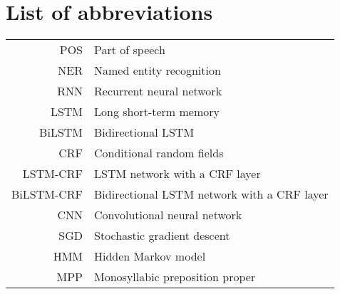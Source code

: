 \documentclass[english,bachelor,unicode]{ctufit-thesis}
\theoremstyle{plain}
\theoremstyle{definition}
\theoremstyle{remark}
\numberwithin{theorem}{chapter}
\begin{document}
\printabstractpage %











\chapter{List of abbreviations}
	
\begin{tabular}{rl}
POS & Part of speech\\
NER & Named entity recognition\\
RNN & Recurrent neural network\\
LSTM & Long short-term memory\\
BiLSTM & Bidirectional LSTM\\
CRF & Conditional random fields\\
LSTM-CRF & LSTM network with a CRF layer\\
BiLSTM-CRF & Bidirectional LSTM network with a CRF layer\\
CNN & Convolutional neural network\\
SGD & Stochastic gradient descent\\
HMM & Hidden Markov model\\
MPP & Monosyllabic preposition proper
\end{tabular}
\end{document}
